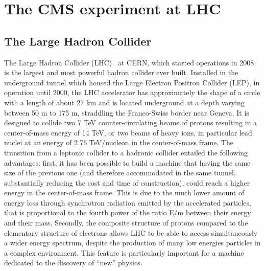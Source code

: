 \chapter{The CMS experiment at LHC}

\section{The Large Hadron Collider}
The Large Hadron Collider (LHC)~\cite{Pettersson:291782}  at CERN,
which started operations in 2008, is the largest and most powerful hadron collider ever built. Installed in the
underground tunnel which housed the Large Electron Positron Collider (LEP),
in operation until 2000, the LHC accelerator
has approximately the shape of a circle with a length of about 27 km
and is located underground at a depth varying
between 50 m to 175 m, straddling the Franco-Swiss border near Geneva. It is designed
to collide two 7 TeV counter-circulating beams of protons resulting in a center-of-mass
energy of 14 TeV, or two beams of heavy ions, in particular lead nuclei at an energy of
2.76 TeV/nucleon in the center-of-mass frame.
The transition from a leptonic collider to a hadronic collider entailed the following
advantages: first, it has been possible to build a machine that having the same size of the
previous one (and therefore accommodated in the same tunnel,
substantially reducing the cost and time of construction), could reach
a higher energy in the center-of-mass
frame. This is due to the much lower amount of energy loss through synchrotron radiation
emitted by the accelerated particles, that is proportional to the fourth power of the ratio
E/m between their energy and their mass. Secondly, the composite structure of protons
compared to the elementary structure of electrons allows LHC to be able to access simultaneously a wider energy spectrum, despite the production of many low energies particles in a complex environment. This feature is particularly important for a machine dedicated
to the discovery of “new” physics.

